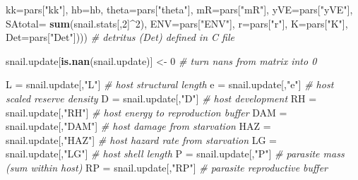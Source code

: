 \documentclass[10,portrait]{article}
\newenvironment{Shaded}{\begin{snugshade}}{\end{snugshade}}
\newcommand{\KeywordTok}[1]{\textcolor[rgb]{0.13,0.29,0.53}{\textbf{#1}}}
\newcommand{\DataTypeTok}[1]{\textcolor[rgb]{0.13,0.29,0.53}{#1}}
\newcommand{\DecValTok}[1]{\textcolor[rgb]{0.00,0.00,0.81}{#1}}
\newcommand{\StringTok}[1]{\textcolor[rgb]{0.31,0.60,0.02}{#1}}
\newcommand{\CommentTok}[1]{\textcolor[rgb]{0.56,0.35,0.01}{\textit{#1}}}
\newcommand{\OperatorTok}[1]{\textcolor[rgb]{0.81,0.36,0.00}{\textbf{#1}}}
\newcommand{\NormalTok}[1]{#1}
\begin{document}
\begin{Shaded}
\begin{Highlighting}[]
{{{{{                                                                \DataTypeTok{kk=}\NormalTok{pars[}\StringTok{"kk"}\NormalTok{], }
                                                                \DataTypeTok{hb=}\NormalTok{hb,}
                                                                \DataTypeTok{theta=}\NormalTok{pars[}\StringTok{"theta"}\NormalTok{], }\DataTypeTok{mR=}\NormalTok{pars[}\StringTok{"mR"}\NormalTok{], }\DataTypeTok{yVE=}\NormalTok{pars[}\StringTok{"yVE"}\NormalTok{], }\DataTypeTok{SAtotal=} \KeywordTok{sum}\NormalTok{(snail.stats[,}\DecValTok{2}\NormalTok{]}\OperatorTok{^}\DecValTok{2}\NormalTok{), }
                                                                \DataTypeTok{ENV=}\NormalTok{pars[}\StringTok{"ENV"}\NormalTok{], }\DataTypeTok{r=}\NormalTok{pars[}\StringTok{"r"}\NormalTok{], }\DataTypeTok{K=}\NormalTok{pars[}\StringTok{"K"}\NormalTok{], }
                                                                \DataTypeTok{Det=}\NormalTok{pars[}\StringTok{"Det"}\NormalTok{]))) }\CommentTok{# detritus (Det) defined in C file}
                        
\NormalTok{                        snail.update[}\KeywordTok{is.nan}\NormalTok{(snail.update)] <-}\StringTok{ }\DecValTok{0} \CommentTok{# turn nans from matrix into 0}
                        
\NormalTok{                        L =}\StringTok{ }\NormalTok{snail.update[,}\StringTok{"L"}\NormalTok{] }\CommentTok{# host structural length}
\NormalTok{                        e =}\StringTok{ }\NormalTok{snail.update[,}\StringTok{"e"}\NormalTok{] }\CommentTok{# host scaled reserve density    }
\NormalTok{                        D =}\StringTok{ }\NormalTok{snail.update[,}\StringTok{"D"}\NormalTok{] }\CommentTok{# host development }
\NormalTok{                        RH =}\StringTok{ }\NormalTok{snail.update[,}\StringTok{"RH"}\NormalTok{] }\CommentTok{# host energy to reproduction buffer  }
\NormalTok{                        DAM =}\StringTok{ }\NormalTok{snail.update[,}\StringTok{"DAM"}\NormalTok{] }\CommentTok{# host damage from starvation  }
\NormalTok{                        HAZ =}\StringTok{ }\NormalTok{snail.update[,}\StringTok{"HAZ"}\NormalTok{] }\CommentTok{# host hazard rate from starvation   }
\NormalTok{                        LG =}\StringTok{ }\NormalTok{snail.update[,}\StringTok{"LG"}\NormalTok{] }\CommentTok{# host shell length  }
\NormalTok{                        P =}\StringTok{ }\NormalTok{snail.update[,}\StringTok{"P"}\NormalTok{] }\CommentTok{# parasite mass (sum within host)}
\NormalTok{                        RP =}\StringTok{ }\NormalTok{snail.update[,}\StringTok{"RP"}\NormalTok{] }\CommentTok{# parasite reproductive buffer  }
                        
}}}}}
\end{Highlighting}
\end{Shaded}
\end{document}
